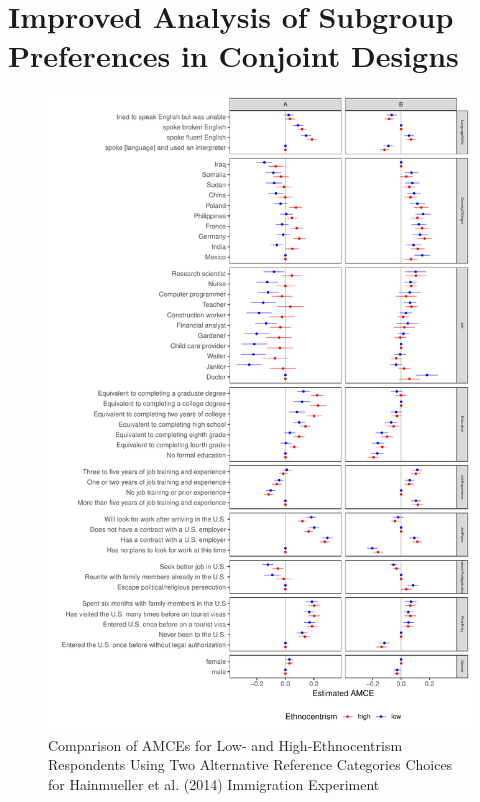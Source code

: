 \documentclass[a4paper,12pt]{article}\usepackage[]{graphicx}\usepackage[]{color}
\makeatletter
\def\maxwidth{ %
  \ifdim\Gin@nat@width>\linewidth
    \linewidth
  \else
    \Gin@nat@width
  \fi
}
\newenvironment{knitrout}{}{} %
\makeatother
\begin{document}
\section*{Improved Analysis of Subgroup Preferences in Conjoint Designs}\label{sec:marginalmeans}



\begin{knitrout}
\color{fgcolor}\begin{figure}
\includegraphics[width=\maxwidth]{figure/hainmueller_subgroup_example_plot-1} \caption[Comparison of AMCEs for Low- and High-Ethnocentrism Respondents Using Two Alternative Reference Categories Choices for Hainmueller et al]{Comparison of AMCEs for Low- and High-Ethnocentrism Respondents Using Two Alternative Reference Categories Choices for Hainmueller et al. (2014) Immigration Experiment}\label{fig:hainmueller_subgroup_example_plot}
\end{figure}


\end{knitrout}
\end{document}
